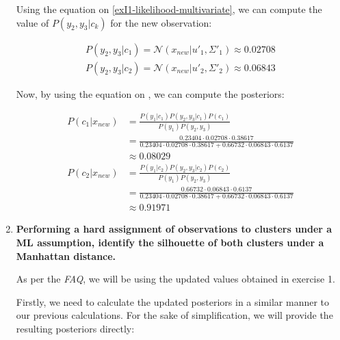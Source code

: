 \documentclass[12pt]{article}
\begin{document}
\begin{enumerate}[leftmargin=\labelsep]
          Using the equation on \eqref{exI1-likelihood-multivariate}, we can compute the value of $P(y_2,y_3|c_k)$ for the new observation:

          \begingroup
          \addtolength{\jot}{0.5em}
          \begin{align*}
              P(y_2,y_3|c_1) = \mathcal{N}(x_{new} | u'_1, \Sigma'_{1}) \approx 0.02708 \\
              P(y_2,y_3|c_2) = \mathcal{N}(x_{new} | u'_2, \Sigma'_{2}) \approx 0.06843
          \end{align*}
          \endgroup

          Now, by using the equation on , we can compute the posteriors:

          \begingroup
          \addtolength{\jot}{0.5em}
          \begin{align*}
            P(c_1 | x_{new}) & = \frac{P(y_1|c_1)P(y_2,y_3|c_1)P(c_1)}{P(y_1)P(y_2,y_3)} \\
                             & = \frac{0.23404 \cdot 0.02708 \cdot 0.38617}{0.23404 \cdot 0.02708 \cdot 0.38617 + 0.66732 \cdot 0.06843 \cdot 0.6137} \\
                             & \approx 0.08029 \\
            P(c_2 | x_{new}) & = \frac{P(y_1|c_2)P(y_2,y_3|c_2)P(c_2)}{P(y_1)P(y_2,y_3)} \\
                             & = \frac{0.66732 \cdot 0.06843 \cdot 0.6137}{0.23404 \cdot 0.02708 \cdot 0.38617 + 0.66732 \cdot 0.06843 \cdot 0.6137} \\
                             & \approx 0.91971
          \end{align*}
          \endgroup

    \item \textbf{Performing a hard assignment of observations to clusters under a ML assumption, identify the silhouette of both clusters under a Manhattan distance.}

          \vskip 0.3cm
          As per the \textit{FAQ}, we will be using the updated values obtained in exercise 1.

          Firstly, we need to calculate the updated posteriors in a similar manner to our previous calculations. For the sake of simplification, we will provide the
           resulting posteriors directly:


\end{enumerate}
\end{document}
